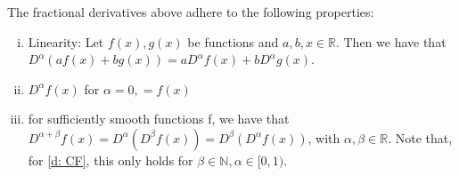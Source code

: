 \begin{proposition} 
    The fractional derivatives above adhere to the following properties:
    \begin{enumerate}[(i)]
        \item Linearity: Let \(f(x), g(x)\) be functions and \(a, b, x \in \mathbb{R}\). Then we have that \(D^{\alpha} (a f(x) + b g(x)) = a D^{\alpha} f(x) + b D^{\alpha} g(x)\).
        \item \(D^{\alpha} f(x)\) for \(\alpha = 0, = f(x)\) 
        \item for sufficiently smooth functions f, we have that \(D^{\alpha + \beta} f(x) = D^\alpha(D^\beta f(x)) =  D^\beta(D^\alpha f(x))\), with \(\alpha, \beta \in \mathbb{R}\). Note that, for \ref{d: CF}, this only holds for \(\beta \in \mathbb{N}, \alpha \in [0,1)\).
    \end{enumerate}
        
    
\end{proposition}

